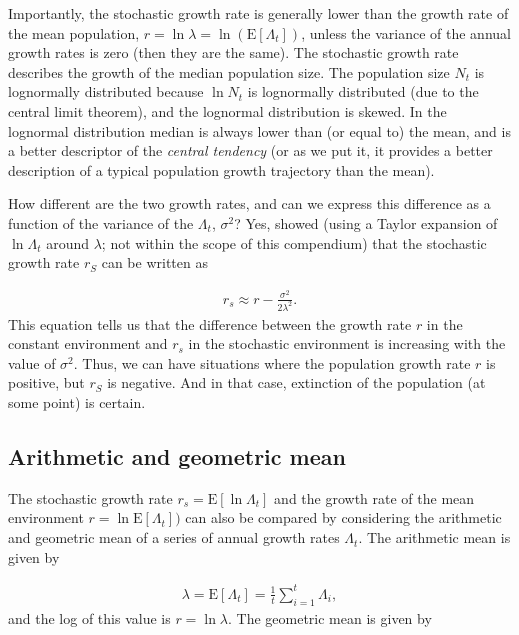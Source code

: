 \documentclass[
]{book}
\begin{document}
Importantly, the stochastic growth rate is generally lower than the growth rate of the mean population, \(r=\ln \lambda=\ln(\text{E}[\Lambda_t])\), unless the variance of the annual growth rates is zero (then they are the same). The stochastic growth rate describes the growth of the median population size. The population size \(N_t\) is lognormally distributed because \(\ln N_t\) is lognormally distributed (due to the central limit theorem), and the lognormal distribution is skewed. In the lognormal distribution median is always lower than (or equal to) the mean, and is a better descriptor of the \emph{central tendency} (or as we put it, it provides a better description of a typical population growth trajectory than the mean).

How different are the two growth rates, and can we express this difference as a function of the variance of the \(\Lambda_t\), \(\sigma^2\)? Yes, \citet{Lewontin1} showed (using a Taylor expansion of \(\ln \Lambda_t\) around \(\lambda\); not within the scope of this compendium) that the stochastic growth rate \(r_S\) can be written as

\begin{align} 
r_s\approx r-\frac{\sigma^2}{2\lambda^2}.
\label{eq:Taylor}
\end{align}
This equation tells us that the difference between the growth rate \(r\) in the constant environment and \(r_s\) in the stochastic environment is increasing with the value of \(\sigma^2\). Thus, we can have situations where the population growth rate \(r\) is positive, but \(r_S\) is negative. And in that case, extinction of the population (at some point) is certain.

\hypertarget{arithmetic-and-geometric-mean}{%
\subsection{Arithmetic and geometric mean}\label{arithmetic-and-geometric-mean}}

The stochastic growth rate \(r_s=\text{E}[\ln \Lambda_t]\) and the growth rate of the mean environment \(r=\ln \text{E}[\Lambda_t])\) can also be compared by considering the arithmetic and geometric mean of a series of annual growth rates \(\Lambda_t\). The arithmetic mean is given by

\begin{align} 
\lambda=\text{E}[\Lambda_t]=\frac{1}{t}\sum_{i=1}^t\Lambda_i, 
\end{align}
and the log of this value is \(r=\ln \lambda\). The geometric mean is given by
\end{document}

